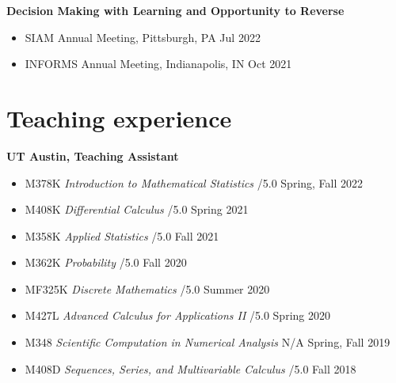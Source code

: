 \documentclass[margin,line]{res}
\newcommand{\vvspace}{\vspace{0.1in}}
\begin{document}
\begin{resume}
{\bf Decision Making with Learning and Opportunity to Reverse}

\begin{itemize}[leftmargin=0.15in]
\item SIAM Annual Meeting, Pittsburgh, PA \hfill{Jul 2022}
\item INFORMS Annual Meeting, Indianapolis, IN \hfill{Oct 2021}
\end{itemize}


\section{\sc Teaching experience}
{\bf UT Austin, Teaching Assistant}
\vspace{-0.3cm}

\vvspace
\begin{itemize}[leftmargin=0.15in]
\item M378K \textit{Introduction to Mathematical Statistics} /5.0  \hfill {Spring, Fall 2022}
\item M408K \textit{Differential Calculus} /5.0 \hfill {Spring 2021}
\item M358K \textit{Applied Statistics} /5.0 \hfill {Fall 2021}
\item M362K \textit{Probability} /5.0  \hfill { Fall 2020}



\item MF325K \textit{Discrete Mathematics} /5.0  \hfill { Summer 2020}
\item M427L \textit{Advanced Calculus for Applications II} /5.0 \hfill{Spring 2020}
\item M348 \textit{Scientific Computation in Numerical Analysis} \quad N/A \hfill{Spring, Fall 2019}
\item M408D \textit{Sequences, Series, and Multivariable Calculus} /5.0 \hfill{Fall 2018}
\end{itemize}



\end{resume}
\end{document}
